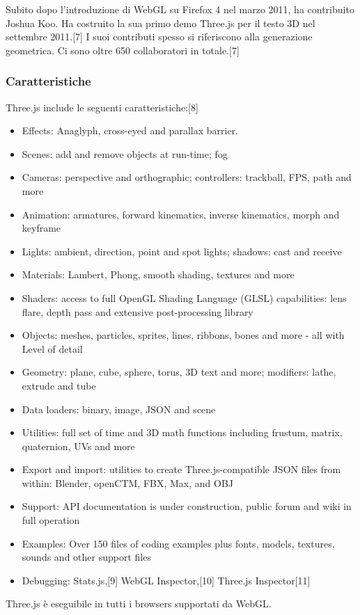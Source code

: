 Subito dopo l'introduzione di WebGL su Firefox 4 nel marzo 2011, ha contribuito Joshua Koo. Ha costruito la sua
primo demo Three.js per il testo 3D nel settembre 2011.[7] I suoi contributi spesso si riferiscono alla generazione geometrica.
Ci sono oltre 650 collaboratori in totale.[7]

\subsubsection{Caratteristiche}
Three.js include le seguenti caratteristiche:[8]
\begin{itemize}

\item Effects: Anaglyph, cross-eyed and parallax barrier.
\item Scenes: add and remove objects at run-time; fog
\item Cameras: perspective and orthographic; controllers: trackball, FPS, path and more
\item Animation: armatures, forward kinematics, inverse kinematics, morph and keyframe
\item Lights: ambient, direction, point and spot lights; shadows: cast and receive
\item Materials: Lambert, Phong, smooth shading, textures and more
\item Shaders: access to full OpenGL Shading Language (GLSL) capabilities: lens flare, depth pass and extensive post-processing library
\item Objects: meshes, particles, sprites, lines, ribbons, bones and more - all with Level of detail
\item Geometry: plane, cube, sphere, torus, 3D text and more; modifiers: lathe, extrude and tube
\item Data loaders: binary, image, JSON and scene
\item Utilities: full set of time and 3D math functions including frustum, matrix, quaternion, UVs and more
\item Export and import: utilities to create Three.js-compatible JSON files from within: Blender, openCTM, FBX, Max, and OBJ
\item Support: API documentation is under construction, public forum and wiki in full operation
\item Examples: Over 150 files of coding examples plus fonts, models, textures, sounds and other support files
\item Debugging: Stats.js,[9] WebGL Inspector,[10] Three.js Inspector[11]
\end{itemize}

Three.js è eseguibile in tutti i browsers supportati da WebGL.

